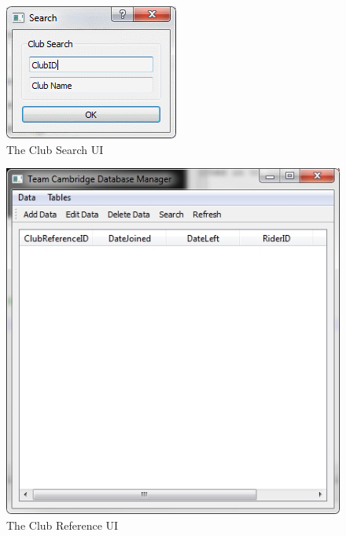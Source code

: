 \begin{figure}
\includegraphics[width=\textwidth]{./Maintenance/UI/ClubSearch.png}
\caption{The Club Search UI} \label{fig:ClubSearch_UI}
\end{figure}

\begin{figure}
\includegraphics[width=\textwidth]{./Maintenance/UI/ClubRef.png}
\caption{The Club Reference UI} \label{fig:ClubRef_UI}
\end{figure}

